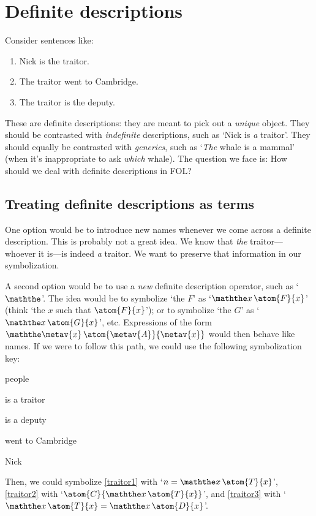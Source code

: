 \chapter{Definite descriptions}\label{subsec.defdesc}
Consider sentences like:
	\begin{enumerate}
		\item\label{traitor1} Nick is the traitor.
		\item\label{traitor2} The traitor went to Cambridge.
		\item\label{traitor3} The traitor is the deputy.
	\end{enumerate}
These are definite descriptions: they are meant to pick out a \emph{unique} object. They should be contrasted with \emph{indefinite} descriptions, such as `Nick  is \emph{a} traitor'. They should equally be contrasted with \emph{generics}, such as `\emph{The} whale is a mammal' (when it's inappropriate to ask \emph{which} whale). The question we face is: How should we deal with definite descriptions in FOL?


\section{Treating definite descriptions as terms}
One option would be to introduce new names whenever we come across a definite description. This is probably not a great idea. We know that \emph{the} traitor---whoever it is---is indeed \emph{a} traitor. We want to preserve that information in our symbolization.

A second option would be to use a \emph{new} definite description operator, such as `$\maththe$'. The idea would be to symbolize `the $F$' as `$\maththe x\,\atom{F}{x}$'  (think `the $x$ such that $\atom{F}{x}$'); or to symbolize `the $G$' as `$\maththe x\,\atom{G}{x}$', etc. Expressions of the form $\maththe \metav{x}\, \atom{\metav{A}}{\metav{x}}$ would then behave like names. If we were to follow this path, we could use the following symbolization key:
	\begin{ekey}
		\item[\text{domain}] people
		\item[\atom{T}{x}]  is a traitor
		\item[\atom{D}{x}]  is a deputy
		\item[\atom{C}{x}]  went to Cambridge
		\item[n] Nick
	\end{ekey}
Then, we could symbolize \cref{traitor1} with `$n = \maththe x\, \atom{T}{x}$', \cref{traitor2} with `$\atom{C}{\maththe x\,\atom{T}{x}}$', and \cref{traitor3} with `$\maththe x\, \atom{T}{x} = \maththe x\, \atom{D}{x}$'.

